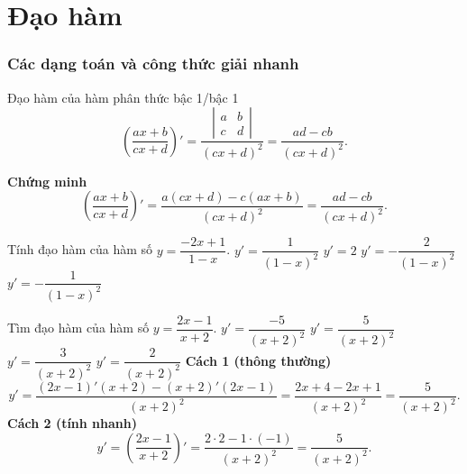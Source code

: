 \chapter{Đạo hàm}
\subsection*{Các dạng toán và công thức giải nhanh}
\begin{dang}{Đạo hàm của hàm phân thức bậc 1/bậc 1}
	$$\left( \dfrac{ax+b}{cx+d}\right)' = \dfrac{\left|\begin{matrix}
		a & b \\
		c & d
		\end{matrix}\right|}{(cx+d)^2}=\dfrac{ad-cb}{(cx+d)^2}.$$
\end{dang}
\textbf{Chứng minh}\\
$$\left( \dfrac{ax+b}{cx+d}\right)' =\dfrac{a(cx+d)-c(ax+b)}{(cx+d)^2}
=\dfrac{ad-cb}{(cx+d)^2}.$$

\begin{vd}%
	Tính đạo hàm của hàm số $y=\dfrac{-2x+1}{1-x}$.
	\choice
	{$y'=\dfrac{1}{(1-x)^2}$}
	{$y'=2$}
	{$y'=-\dfrac{2}{(1-x)^2}$}
	{\True $y'=-\dfrac{1}{(1-x)^2}$}
\end{vd}
\begin{vd}%
	Tìm đạo hàm của hàm số $y=\dfrac{2x-1}{x+2}$.
	\choice
	{$y'=\dfrac{-5}{(x+2)^2}$}
	{\True $y'=\dfrac{5}{(x+2)^2}$}
	{$y'=\dfrac{3}{(x+2)^2}$}
	{$y'=\dfrac{2}{(x+2)^2}$}
	\loigiai
	{
		\textbf{Cách 1 (thông thường)}
		$$y'=\dfrac{(2x-1)'(x+2)-(x+2)'(2x-1)}{(x+2)^2}=\dfrac{2x+4-2x+1}{(x+2)^2}=\dfrac{5}{(x+2)^2}.$$
		\textbf{Cách 2 (tính nhanh)}
		$$y'=\left(\dfrac{2x-1}{x+2}\right)'=\dfrac{2\cdot2 -1\cdot (-1)}{(x+2)^2}=\dfrac{5}{(x+2)^2}.$$
	}
\end{vd}

